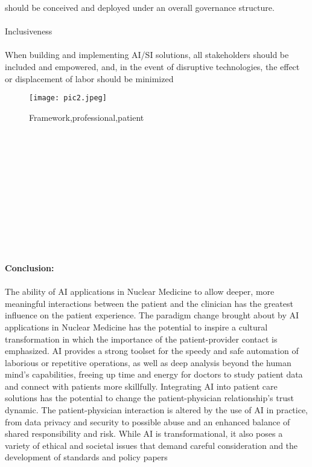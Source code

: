 \documentclass[12pt]{article}
\begin{document}
should be conceived and deployed under an overall governance structure.\\\\
Inclusiveness\\\\
When building and implementing AI/SI solutions, all stakeholders should be included and empowered, and, in
the event of disruptive technologies, the effect or displacement of labor should be minimized\\
\begin{figure}
    \centering
    \texttt{[image: pic2.jpeg]}
    \caption{Framework,professional,patient}
\end{figure}
\\\\\\\\\\\\\\\\\\\\\\
\noindent \textbf{\large Conclusion:} \\ \\ The ability of AI applications in Nuclear Medicine to allow deeper, more meaningful interactions between the
patient and the clinician has the greatest influence on the patient experience. The paradigm change brought
about by AI applications in Nuclear Medicine has the potential to inspire a cultural transformation in which the
importance of the patient-provider contact is emphasized. AI provides a strong toolset for the speedy and safe
automation of laborious or repetitive operations, as well as deep analysis beyond the human mind's capabilities, freeing up time and energy for doctors to study patient data and connect with patients more skillfully.
Integrating AI into patient care solutions has the potential to change the patient-physician relationship's trust
dynamic. The patient-physician interaction is altered by the use of AI in practice, from data privacy and security
to possible abuse and an enhanced balance of shared responsibility and risk. While AI is transformational, it also
poses a variety of ethical and societal issues that demand careful consideration and the development of
standards and policy papers\\ \\ 

 
\end{document}
